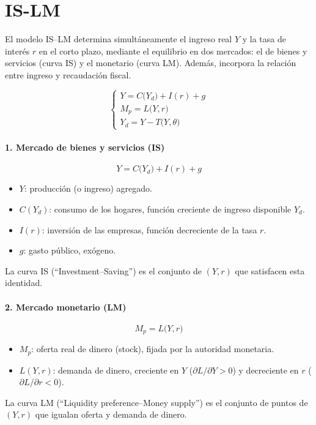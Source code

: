 \documentclass{article}
\begin{document}
\newpage
\section{IS-LM}





El modelo IS–LM determina simultáneamente el ingreso real \(Y\) y la tasa de interés \(r\) en el corto plazo, mediante el equilibrio en dos mercados: el de bienes y servicios (curva IS) y el monetario (curva LM). Además, incorpora la relación entre ingreso y recaudación fiscal.

\[
\begin{cases}
Y = C\bigl(Y_d\bigr) + I(r) + g\\[6pt]
M_p = L\bigl(Y,r\bigr)\\[6pt]
Y_d = Y - T\bigl(Y,\theta\bigr)
\end{cases}
\]

\bigskip

\paragraph{1. Mercado de bienes y servicios (IS)}  
\[
Y = C\bigl(Y_d\bigr) + I(r) + g
\]
\begin{itemize}
  \item \(Y\): producción (o ingreso) agregado.
  \item \(C(Y_d)\): consumo de los hogares, función creciente de ingreso disponible \(Y_d\).
  \item \(I(r)\): inversión de las empresas, función decreciente de la tasa \(r\).
  \item \(g\): gasto público, exógeno.
\end{itemize}
La curva IS (“Investment–Saving”) es el conjunto de \((Y,r)\) que satisfacen esta identidad. 
\bigskip

\paragraph{2. Mercado monetario (LM)}  
\[
M_p = L\bigl(Y,r\bigr)
\]
\begin{itemize}
  \item \(M_p\): oferta real de dinero (stock), fijada por la autoridad monetaria.
  \item \(L(Y,r)\): demanda de dinero, creciente en \(Y\) (\(\partial L/\partial Y>0\)) y decreciente en \(r\) (\(\partial L/\partial r<0\)).
\end{itemize}
La curva LM (“Liquidity preference–Money supply”) es el conjunto de puntos de \((Y,r)\) que igualan oferta y demanda de dinero. 
\end{document}
